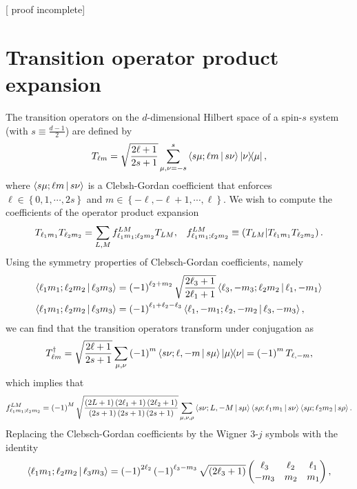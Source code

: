 \documentclass[nofootinbib,notitlepage,twocolumn]{revtex4-2}
\newcommand{\f}[2]{\dfrac{#1}{#2}} %
\newcommand{\p}[1]{\left(#1\right)} %
\renewcommand{\set}[1]{\left\{#1\right\}} %
\newcommand{\bk}{\Braket} %
\newcommand{\1}{\mathds{1}}
\def\obk#1{\mathinner{({#1})}}
\newcommand{\red}[1]{{\color{red} #1}}
\begin{document}
[\red{proof incomplete}]

\vspace{3cm}

\section{Transition operator product expansion}
\label{sec:trans_prod}

The transition operators on the $d$-dimensional Hilbert space of a spin-$s$ system (with $s\equiv\frac{d-1}{2}$) are defined by
\begin{align}
  T_{\ell m} = \sqrt{\f{2\ell+1}{2s+1}} \sum_{\mu,\nu=-s}^s
  \bk{s\mu;\ell m|s\nu} \op{\nu}{\mu},
\end{align}
where $\bk{s\mu;\ell m|s\nu}$ is a Clebsh-Gordan coefficient that enforces $\ell\in\set{0,1,\cdots,2s}$ and $m\in\set{-\ell,-\ell+1,\cdots,\ell}$.
We wish to compute the coefficients of the operator product expansion
\begin{align}
  T_{\ell_1 m_1} T_{\ell_2 m_2}
  = \sum_{L,M} f_{\ell_1 m_1;\ell_2 m_2}^{LM} T_{LM},
  &&
  f_{\ell_1 m_1;\ell_2 m_2}^{LM}
  \equiv \obk{T_{LM} | T_{\ell_1 m_1} T_{\ell_2 m_2}}.
\end{align}
Using the symmetry properties of Clebsch-Gordan coefficients, namely
\begin{align}
  \bk{\ell_1 m_1; \ell_2 m_2| \ell_3 m_3}
  &= \p{-1}^{\ell_2+m_2} \sqrt{\f{2\ell_3+1}{2\ell_1+1}}
  \bk{\ell_3,-m_3; \ell_2 m_2| \ell_1,-m_1} \\
  \bk{\ell_1 m_1; \ell_2 m_2| \ell_3 m_3}
  &= \p{-1}^{\ell_1+\ell_2-\ell_3}
  \bk{\ell_1,-m_1; \ell_2,-m_2| \ell_3,-m_3},
\end{align}
we can find that the transition operators transform under conjugation as
\begin{align}
  T_{\ell m}^\dag
  = \sqrt{\f{2\ell+1}{2s+1}}
  \sum_{\mu,\nu} \p{-1}^m \bk{s\nu;\ell,-m|s\mu} \op{\mu}{\nu}
  = \p{-1}^m T_{\ell,-m},
\end{align}
which implies that
\begin{align}
  f_{\ell_1 m_1;\ell_2 m_2}^{LM}
  = \p{-1}^M \sqrt{\f{\p{2L+1}\p{2\ell_1+1}\p{2\ell_2+1}}
    {\p{2s+1}\p{2s+1}\p{2s+1}}}
  \sum_{\mu,\nu,\rho} \bk{s\nu;L,-M|s\mu}
  \bk{s\rho;\ell_1m_1|s\nu} \bk{s\mu;\ell_2m_2|s\rho}.
\end{align}
Replacing the Clebsch-Gordan coefficients by the Wigner 3-$j$ symbols with the identity
\begin{align}
  \bk{\ell_1 m_1; \ell_2 m_2| \ell_3 m_3}
  = \p{-1}^{2\ell_2} \p{-1}^{\ell_3-m_3} \sqrt{\p{2\ell_3+1}}
  \begin{pmatrix}
    \ell_3 & \ell_2 & \ell_1 \\
    -m_3 & m_2 & m_1
  \end{pmatrix},
\end{align}
\end{document}
